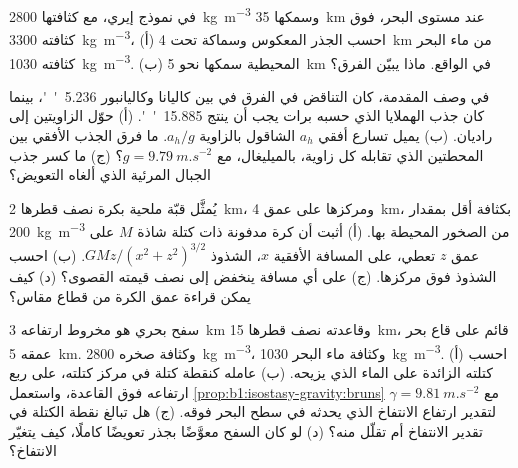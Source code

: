 \begin{exercise}[$\star\star$]\label{exo:b1:isostasy-gravity:8}
في نموذج إيري، مع  كثافتها \qty{2800}{kg.m^{-3}} وسمكها \qty{35}{km} عند مستوى البحر، فوق  كثافته \qty{3300}{kg.m^{-3}}، (أ) احسب الجذر المعكوس وسماكة  تحت \qty{4}{km} من ماء البحر كثافته \qty{1030}{kg.m^{-3}}. (ب)  المحيطية سمكها نحو \qty{5}{km} في الواقع. ماذا يبيّن الفرق؟ %
\end{exercise}

\begin{exercise}[$\star\star$]\label{exo:b1:isostasy-gravity:9}
في وصف المقدمة، كان التناقض في الفرق في  بين كاليانا وكاليانبور \qty{5.236}{''}، بينما كان جذب الهملايا الذي حسبه برات يجب أن ينتج \qty{15.885}{''}. (أ) حوّل الزاويتين إلى راديان. (ب) يميل تسارع أفقي $a_h$ الشاقول بالزاوية $a_h/g$. ما فرق الجذب الأفقي بين المحطتين الذي تقابله كل زاوية، بالميليغال، مع $g = \qty{9.79}{m.s^{-2}}$؟ (ج) ما كسر جذب الجبال المرئية الذي ألغاه التعويض؟
\end{exercise}

\begin{exercise}[$\star\star\star$]\label{exo:b1:isostasy-gravity:10}
يُمثَّل قبّة ملحية بكرة نصف قطرها \qty{2}{km}، ومركزها على عمق \qty{4}{km}، بكثافة أقل بمقدار \qty{200}{kg.m^{-3}} من الصخور المحيطة بها. (أ) أثبت أن كرة مدفونة ذات كتلة شاذة $M$ على عمق $z$ تعطي، على المسافة الأفقية $x$، الشذوذ $GMz/(x^2 + z^2)^{3/2}$. (ب) احسب الشذوذ فوق مركزها. (ج) على أي مسافة ينخفض إلى نصف قيمته القصوى؟ (د) كيف يمكن قراءة عمق الكرة من قطاع مقاس؟
\end{exercise}

\begin{exercise}[$\star\star\star$]\label{exo:b1:isostasy-gravity:11}
سفح بحري هو مخروط ارتفاعه \qty{3}{km} وقاعدته نصف قطرها \qty{15}{km}، قائم على قاع بحر عمقه \qty{5}{km}. وكثافة صخره \qty{2800}{kg.m^{-3}}، وكثافة ماء البحر \qty{1030}{kg.m^{-3}}. (أ) احسب كتلته الزائدة على الماء الذي يزيحه. (ب) عامله كنقطة كتلة في مركز كتلته، على ربع ارتفاعه فوق القاعدة، واستعمل \cref{prop:b1:isostasy-gravity:bruns} مع $\gamma = \qty{9.81}{m.s^{-2}}$ لتقدير ارتفاع الانتفاخ الذي يحدثه في سطح البحر فوقه. (ج) هل تبالغ نقطة الكتلة في تقدير الانتفاخ أم تقلّل منه؟ (د) لو كان السفح معوَّضًا بجذر تعويضًا كاملًا، كيف يتغيّر الانتفاخ؟
\end{exercise}

